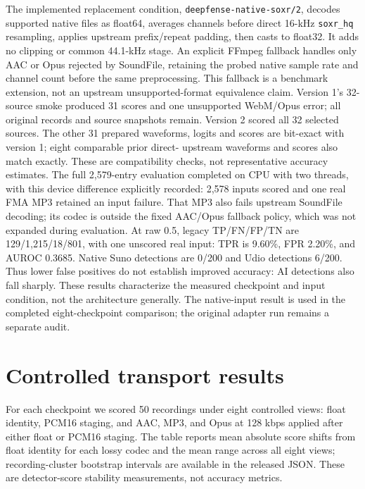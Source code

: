 \documentclass[10pt,a4paper]{article}
\begin{document}
The implemented replacement condition, \texttt{deepfense-native-soxr/2},
decodes supported native files as float64, averages channels before direct
16-kHz \texttt{soxr\_hq} resampling, applies upstream prefix/repeat padding,
then casts to float32. It adds no clipping or common 44.1-kHz stage. An explicit
FFmpeg fallback handles only AAC or Opus rejected by SoundFile, retaining the
probed native sample rate and channel count before the same preprocessing.
This fallback is a benchmark extension, not an upstream unsupported-format
equivalence claim. Version 1's 32-source smoke produced 31 scores and one
unsupported WebM/Opus error; all original records and source snapshots remain.
Version 2 scored all 32 selected sources. The other 31 prepared waveforms,
logits and scores are bit-exact with version 1; eight comparable prior direct-
upstream waveforms and scores also match exactly. These are compatibility
checks, not representative accuracy estimates. The full 2,579-entry evaluation
completed on CPU with two threads, with this device difference explicitly
recorded: 2,578 inputs scored and one real FMA MP3 retained an input failure.
That MP3 also fails upstream SoundFile decoding; its codec is outside the fixed
AAC/Opus fallback policy, which was not expanded during evaluation.
At raw 0.5, legacy TP/FN/FP/TN are 129/1,215/18/801, with one unscored real
input: TPR is 9.60\%, FPR 2.20\%, and AUROC 0.3685. Native Suno detections
are 0/200 and Udio detections 6/200. Thus lower false positives do not establish
improved accuracy: AI detections also fall sharply. These results characterize
the measured checkpoint and input condition, not the architecture generally.
The native-input result is used in the completed eight-checkpoint comparison;
the original adapter run remains a separate audit.

\section{Controlled transport results}

For each checkpoint we scored 50 recordings under eight controlled views:
float identity, PCM16 staging, and AAC, MP3, and Opus at 128 kbps applied after
either float or PCM16 staging. The table reports mean absolute score shifts from
float identity for each lossy codec and the mean range across all eight views;
recording-cluster bootstrap intervals are available in the released JSON.
These are detector-score stability measurements, not accuracy metrics.

\begin{table}[ht]
\centering\small
\resizebox{\linewidth}{!}{}
\caption{Completed controlled transport evaluation (406 inputs per
checkpoint: 400 controlled views and 6 native-pair views). Values are mean
absolute probability shifts or the mean within-recording range. The three
native pairs are descriptive because provider transport may change more than
the codec.}
\label{tab:transport}
\end{table}
\end{document}
